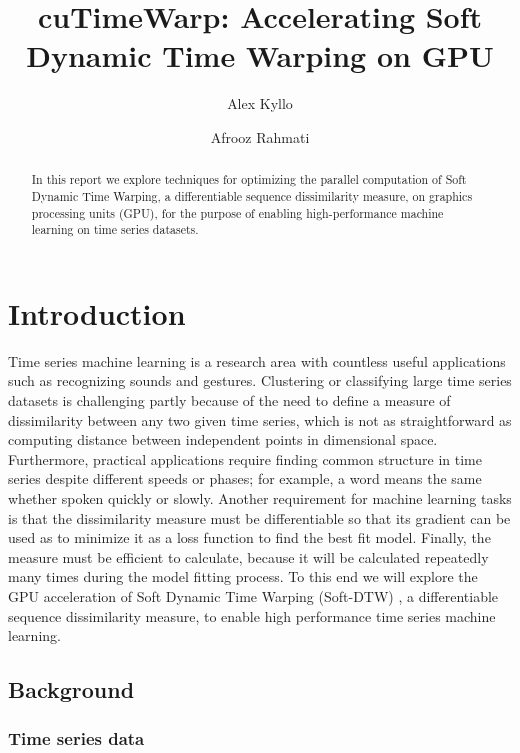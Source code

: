 \documentclass[12pt, letterpaper]{article}
\title{cuTimeWarp: Accelerating Soft Dynamic Time Warping on GPU}
\author{Alex Kyllo \and Afrooz Rahmati}
\begin{document}
\maketitle

\begin{abstract}

In this report we explore techniques for optimizing the parallel computation of
Soft Dynamic Time Warping, a differentiable sequence dissimilarity measure, on
graphics processing units (GPU), for the purpose of enabling high-performance
machine learning on time series datasets.

\end{abstract}

\section{Introduction}

Time series machine learning is a research area with countless useful
applications such as recognizing sounds and gestures. Clustering or classifying
large time series datasets is challenging partly because of the need to define a
measure of dissimilarity between any two given time series, which is not as
straightforward as computing distance between independent points in dimensional
space. Furthermore, practical applications require finding common structure in
time series despite different speeds or phases; for example, a word means the
same whether spoken quickly or slowly. Another requirement for machine learning
tasks is that the dissimilarity measure must be differentiable so that its
gradient can be used as to minimize it as a loss function to find the best fit
model. Finally, the measure must be efficient to calculate, because it will be
calculated repeatedly many times during the model fitting process. To this end
we will explore the GPU acceleration of Soft Dynamic Time Warping (Soft-DTW)
\cite{cuturi_soft-dtw_2018}, a differentiable sequence dissimilarity measure, to
enable high performance time series machine learning.

\subsection{Background}

\subsubsection{Time series data}
\end{document}
